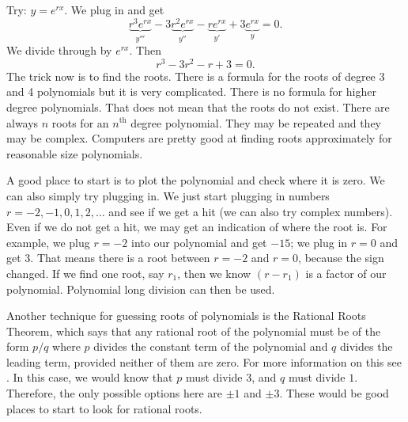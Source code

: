 \documentclass{ximera}
\begin{document}
\begin{exampleSol}
    Try: $y = e^{rx}$.  We plug in and get
    \begin{equation*}
        \underbrace{r^3 e^{rx}}_{y'''} - 3 \underbrace{r^2 e^{rx}}_{y''} - \underbrace{r e^{rx}}_{y'} + 3 \underbrace{e^{rx}}_{y} = 0 .
    \end{equation*}
    We divide through by $e^{rx}$.  Then 
    \begin{equation*}
        r^3 - 3 r^2 - r + 3 = 0 .
    \end{equation*}
    The trick now is to find the roots.  There is a formula for the roots of degree 3 and 4 polynomials but it is very complicated.  There is no formula for higher degree polynomials.  That does not mean that the roots do not exist.  There are always $n$ roots for an $n^{\text{th}}$ degree polynomial.  They may be repeated and they may be complex.  Computers are pretty good at finding roots approximately for reasonable size polynomials.
    
    A good place to start is to plot the polynomial and check where it is zero. We can also simply try plugging in.  We just start plugging in numbers $r=-2,-1,0,1,2,\ldots$ and see if we get a hit (we can also try complex numbers).  Even if we do not get a hit, we may get an indication of where the root is.  For example, we plug $r=-2$ into our polynomial and get $-15$; we plug in $r=0$ and get 3. That means there is a root between $r=-2$ and $r=0$, because the sign changed. If we find one root, say $r_1$, then we know $(r-r_1)$ is a factor of our polynomial.  Polynomial long division can then be used. 
    
    Another technique for guessing roots of polynomials is the Rational Roots Theorem, which says that any rational root of the polynomial must be of the form $p/q$ where $p$ divides the constant term of the polynomial and $q$ divides the leading term, provided neither of them are zero. For more information on this see . In this case, we would know that $p$ must divide $3$, and $q$ must divide $1$. Therefore, the only possible options here are $\pm 1$ and $\pm 3$. These would be good places to start to look for rational roots. 
    

\end{exampleSol}
\end{document}
